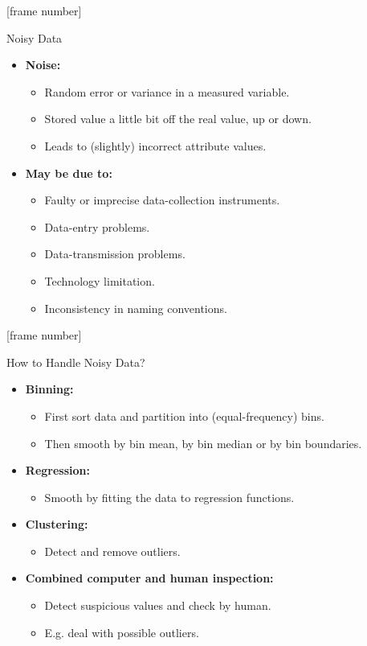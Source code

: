 \documentclass[aspectratio=169,t]{beamer}
\begin{document}
  {
    [frame number]
    \begin{frame}{Noisy Data}
    \begin{itemize}
      \item \textbf{\color{airforceblue}Noise:}
      \begin{itemize}
        \item Random error or variance in a measured variable.
        \item Stored value a little bit off the real value, up or down.
        \item Leads to (slightly) incorrect attribute values.
      \end{itemize}
      \item \textbf{May be due to:}
      \begin{itemize}
        \item Faulty or imprecise data-collection instruments.
        \item Data-entry problems.
        \item Data-transmission problems.
        \item Technology limitation.
        \item Inconsistency in naming conventions.
      \end{itemize}
    \end{itemize}
    \end{frame}
  }

  {
    [frame number]
    \begin{frame}{How to Handle Noisy Data?}
    \begin{itemize}
        \item \textbf{Binning:}
        \begin{itemize}
          \item First sort data and partition into (equal-frequency) bins.
          \item Then smooth by bin mean, by bin median or by bin boundaries.
        \end{itemize}
        \item \textbf{Regression:}
        \begin{itemize}
          \item Smooth by fitting the data to regression functions.
        \end{itemize}
        \item \textbf{Clustering:}
        \begin{itemize}
          \item Detect and remove outliers.
        \end{itemize}
        \item \textbf{Combined computer and human inspection:}
        \begin{itemize}
          \item Detect suspicious values and check by human.
          \item E.g. deal with possible outliers.
        \end{itemize}
    \end{itemize}
    \end{frame}
  }
\end{document}
